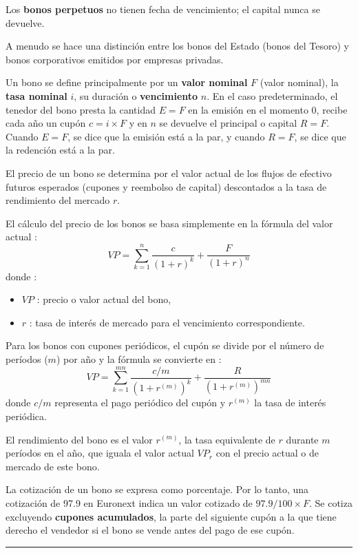 \begin{f}
Los \textbf{bonos perpetuos} no tienen fecha de vencimiento; el capital nunca se devuelve.
 
A menudo se hace una distinción entre los bonos del Estado (bonos del Tesoro) y
 bonos corporativos emitidos por empresas privadas.



Un bono se define principalmente por un \textbf{valor nominal} \(F\) (valor nominal), la \textbf{tasa nominal} \(i\), su duración o \textbf{vencimiento} \(n\).
En el caso predeterminado, el tenedor del bono presta la cantidad \(E=F\) en la emisión en el momento 0, recibe cada año un cupón \(c = i \times F\) y en \(n\) se devuelve el principal o capital \(R=F\).
Cuando \(E=F\), se dice que la emisión está a la par, y cuando \(R=F\), se dice que la redención está a la par.


El precio de un bono se determina por el valor actual de los flujos de efectivo futuros esperados (cupones y reembolso de capital) descontados a la tasa de rendimiento del mercado \(r\).

El cálculo del precio de los bonos se basa simplemente en la fórmula del valor actual :
\[
VP = \sum_{k=1}^{n} \frac{c}{(1 + r)^k} + \frac{F}{(1 + r)^n}
 \]
donde :
\begin{itemize}
	\item \(VP\) : precio o valor actual  del bono,
	\item \(r\) : tasa de interés de mercado para el vencimiento correspondiente.
\end{itemize}


Para los bonos con cupones periódicos, el cupón se divide por el número de períodos (\(m\)) por año y la fórmula se convierte en :
\[ 
VP = \sum_{k=1}^{mn} \frac{c/m}{(1 + r^{(m)})^k} + \frac{R}{(1 + r^{(m)})^{mn}}
 \]
donde \(c/m\) representa el pago periódico del cupón y \(r^{(m)}\) la tasa de interés periódica.

El rendimiento del bono es el valor \(r^{(m)}\), la tasa equivalente de \(r\) durante \(m\) períodos en el año, que iguala el valor actual \(VP_r\) con el precio actual o de mercado de este bono. 

La cotización de un bono se expresa como porcentaje. Por lo tanto, una cotización de 97.9 en Euronext indica un valor cotizado de \(97.9 / 100 \times F\). 
Se cotiza excluyendo \textbf{cupones acumulados}, la parte del siguiente cupón a la que tiene derecho el vendedor si el bono se vende antes del pago de ese cupón.
\end{f}
\hrule

